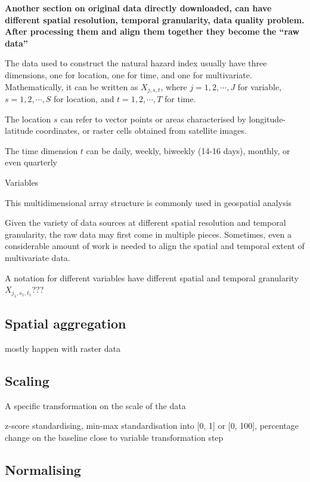\documentclass[
]{article}
\begin{document}
\textbf{Another section on original data directly downloaded, can have
different spatial resolution, temporal granularity, data quality
problem. After processing them and align them together they become the
``raw data''}

The data used to construct the natural hazard index usually have three
dimensions, one for location, one for time, and one for multivariate.
Mathematically, it can be written as \(X_{j, s, t}\), where
\(j = 1, 2, \cdots, J\) for variable, \(s = 1, 2, \cdots, S\) for
location, and \(t = 1, 2, \cdots, T\) for time.

The location \(s\) can refer to vector points or areas characterised by
longitude-latitude coordinates, or raster cells obtained from satellite
images.

The time dimension \(t\) can be daily, weekly, biweekly (14-16 days),
monthly, or even quarterly

Variables

This multidimensional array structure is commonly used in geospatial
analysis

Given the variety of data sources at different spatial resolution and
temporal granularity, the raw data may first come in multiple pieces.
Sometimes, even a considerable amount of work is needed to align the
spatial and temporal extent of multivariate data.

A notation for different variables have different spatial and temporal
granularity \(X_{j_1, s_1, t_1}\)???

\hypertarget{spatial-aggregation}{%
\subsection{Spatial aggregation}\label{spatial-aggregation}}

mostly happen with raster data

\hypertarget{scaling}{%
\subsection{Scaling}\label{scaling}}

A specific transformation on the scale of the data

z-score standardising, min-max standardisation into {[}0, 1{]} or {[}0,
100{]}, percentage change on the baseline close to variable
transformation step

\hypertarget{normalising}{%
\subsection{Normalising}\label{normalising}}
\end{document}
